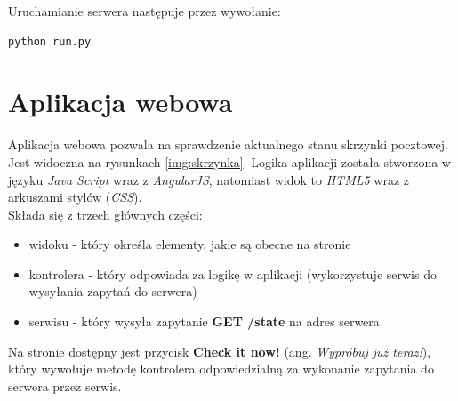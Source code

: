 Uruchamianie serwera następuje przez wywołanie:
\begin{lstlisting}
python run.py
\end{lstlisting}


\section{Aplikacja webowa}

\begin{center}
	\label{img:skrzynka}
\end{center}

Aplikacja webowa pozwala na sprawdzenie aktualnego stanu skrzynki pocztowej. Jest widoczna na rysunkach \ref{img:skrzynka}.
Logika aplikacji została stworzona w języku \textit{Java Script} wraz z \textit{AngularJS}, natomiast widok to \textit{HTML5} wraz z arkuszami stylów (\textit{CSS}).\\

Składa się z trzech głównych części:
\begin{itemize}
\item widoku - który określa elementy, jakie są obecne na stronie
\item kontrolera - który odpowiada za logikę w aplikacji (wykorzystuje serwis do wysyłania zapytań do serwera)
\item serwisu - który wysyła zapytanie \textbf{GET /state} na adres serwera
\end{itemize}

Na stronie dostępny jest przycisk \textbf{Check it now!} (ang. \textit{Wypróbuj już teraz!}), który wywołuje metodę kontrolera odpowiedzialną za wykonanie zapytania do serwera przez serwis.

